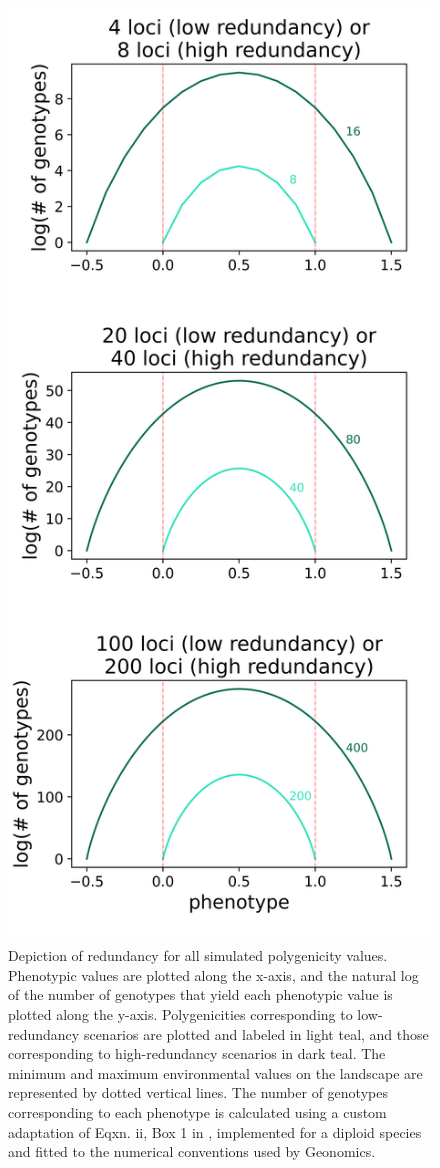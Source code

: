 \documentclass[9pt,twocolumn,twoside,lineno]{pnas-new}
\begin{document}
\begin{figure}
\centering
\includegraphics[width=.8\linewidth]{pub/figs/FIG_S1_redundancy.png}
\caption{Depiction of redundancy for all simulated polygenicity values. Phenotypic values are plotted along the x-axis, and the natural log of the number of genotypes that yield each phenotypic value is plotted along the y-axis. Polygenicities corresponding to low-redundancy scenarios are plotted and labeled in light teal, and those corresponding to high-redundancy scenarios in dark teal. The minimum and maximum environmental values on the landscape are represented by dotted vertical lines. The number of genotypes corresponding to each phenotype is calculated using a custom adaptation of Eqxn. ii, Box 1 in \cite{laruson}, implemented for a diploid species and fitted to the numerical conventions used by Geonomics.
}
\label{fig:fig_s1}
\end{figure}
\end{document}
